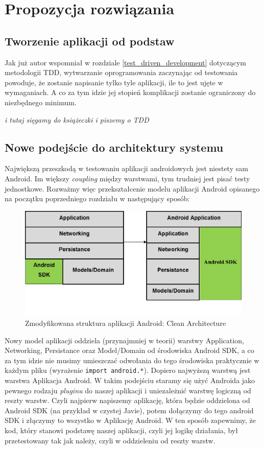 \chapter{Propozycja rozwiązania}

\section{Tworzenie aplikacji od podstaw}
\label{nowa_aplikacja}
Jak już autor wspomniał w rozdziale \ref{test_driven_development} dotyczącym metodologii TDD, wytwarzanie oprogramowania zaczynając od testowania powoduje, że zostanie napisanie tylko tyle aplikacji, ile to jest ujęte w wymaganiach. A co za tym idzie jej stopień komplikacji zostanie ograniczony do niezbędnego minimum.

\textit{i tutaj sięgamy do książeczki i piszemy o TDD}

\section{Nowe podejście do architektury systemu}
\label{clean_architecture}
Największą przeszkodą w testowaniu aplikacji androidowych jest niestety sam Android. Im większy \textit{coupling} między warstwami, tym trudniej jest pisać testy jednostkowe. Rozważmy więc przekształcenie modelu aplikacji Android opisanego na początku poprzedniego rozdziału w następujący sposób:

\begin{figure}[!htb]
    \centering
    \includegraphics[width=13cm]{imgs/ch4_opis_rozwiazania_1.png}
    \caption
{Zmodyfikowana struktura aplikacji Android: Clean Architecture}
    \label{fig:opis_rozwiazania}
\end{figure} 

Nowy model aplikacji oddziela (przynajmniej w teorii) warstwy Application, Networking, Persistance oraz Model/Domain od środowiska Android SDK, a co za tym idzie nie musimy umieszczać odwołania do tego środowiska praktycznie w każdym pliku (wyrażenie \texttt{import android.*}). Dopiero najwyższą warstwą jest warstwa Aplikacja Android. W takim podejściu staramy się użyć Androida jako pewnego rodzaju \textit{pluginu} do naszej aplikacji i uniezależnić warstwę logiczną od reszty warstw. Czyli najpierw napiszemy aplikację, która będzie oddzielona od Android SDK (na przykład w czystej Javie), potem dołączymy do tego android SDK i złączymy to wszystko w Aplikację Android. W ten sposób zapewnimy, że kod, który stanowi podstawę naszej aplikacji, czyli jej logikę działania, był przetestowany tak jak należy, czyli w oddzieleniu od reszty warstw.

